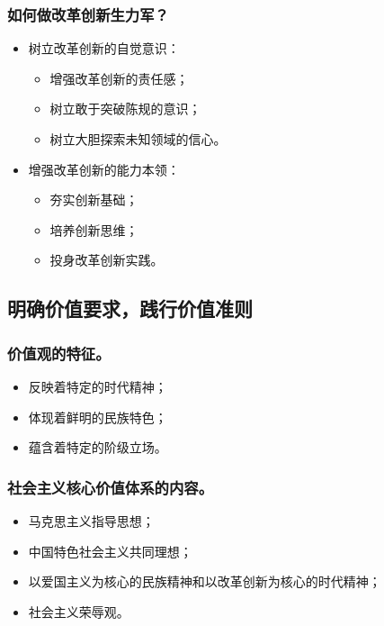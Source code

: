 \documentclass{article}
\begin{document}
\subsubsection{如何做改革创新生力军？}
\begin{itemize}
    \item 树立改革创新的自觉意识：
    \begin{itemize}
        \item 增强改革创新的责任感；
        \item 树立敢于突破陈规的意识；
        \item 树立大胆探索未知领域的信心。
    \end{itemize}
    \item 增强改革创新的能力本领：
    \begin{itemize}
        \item 夯实创新基础；
        \item 培养创新思维；
        \item 投身改革创新实践。
    \end{itemize}
\end{itemize}

\subsection{明确价值要求，践行价值准则}

\subsubsection{价值观的特征。}
\begin{itemize}
    \item 反映着特定的时代精神；
    \item 体现着鲜明的民族特色；
    \item 蕴含着特定的阶级立场。
\end{itemize}

\subsubsection{社会主义核心价值体系的内容。}
\begin{itemize}
    \item 马克思主义指导思想；
    \item 中国特色社会主义共同理想；
    \item 以爱国主义为核心的民族精神和以改革创新为核心的时代精神；
    \item 社会主义荣辱观。
\end{itemize}
\end{document}
